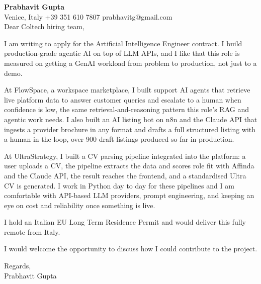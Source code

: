 \documentclass[a4paper,10.5pt]{article}
\begin{document}
\textbf{Prabhavit Gupta}\\
Venice, Italy \textbar{} +39 351 610 7807 \textbar{} prabhavitg@gmail.com\\[10pt]
Dear Coltech hiring team,

I am writing to apply for the Artificial Intelligence Engineer contract. I build production-grade agentic AI on top of LLM APIs, and I like that this role is measured on getting a GenAI workload from problem to production, not just to a demo.

At FlowSpace, a workspace marketplace, I built support AI agents that retrieve live platform data to answer customer queries and escalate to a human when confidence is low, the same retrieval-and-reasoning pattern this role's RAG and agentic work needs. I also built an AI listing bot on n8n and the Claude API that ingests a provider brochure in any format and drafts a full structured listing with a human in the loop, over 900 draft listings produced so far in production.

At UltraStrategy, I built a CV parsing pipeline integrated into the platform: a user uploads a CV, the pipeline extracts the data and scores role fit with Affinda and the Claude API, the result reaches the frontend, and a standardised Ultra CV is generated. I work in Python day to day for these pipelines and I am comfortable with API-based LLM providers, prompt engineering, and keeping an eye on cost and reliability once something is live.

I hold an Italian EU Long Term Residence Permit and would deliver this fully remote from Italy.

I would welcome the opportunity to discuss how I could contribute to the project.

Regards,\\
Prabhavit Gupta
\end{document}
